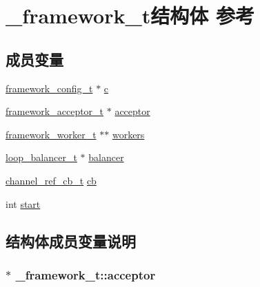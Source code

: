 \hypertarget{a00011}{}\section{\+\_\+framework\+\_\+t结构体 参考}
\label{a00011}
\subsection*{成员变量}
\begin{DoxyCompactItemize}
\item 
\hyperlink{a00047_a55b26efa9e6ee05514d087ba2593a54b_a55b26efa9e6ee05514d087ba2593a54b}{framework\+\_\+config\+\_\+t} $\ast$ \hyperlink{a00011_afe5323ec18afb54a631f5069fd2b904b_afe5323ec18afb54a631f5069fd2b904b}{c}
\item 
\hyperlink{a00047_ab0952db3c97c4760192720875e69d040_ab0952db3c97c4760192720875e69d040}{framework\+\_\+acceptor\+\_\+t} $\ast$ \hyperlink{a00011_a7167c11767ec44a7e5da53a805cfd439_a7167c11767ec44a7e5da53a805cfd439}{acceptor}
\item 
\hyperlink{a00047_aeb7a44e6b579659a8aae81f3ab819af3_aeb7a44e6b579659a8aae81f3ab819af3}{framework\+\_\+worker\+\_\+t} $\ast$$\ast$ \hyperlink{a00011_ae67335a4a11e73fa2c1bfdb0965c60c6_ae67335a4a11e73fa2c1bfdb0965c60c6}{workers}
\item 
\hyperlink{a00047_a649c7e850ab247b5f70ad27e335a129d_a649c7e850ab247b5f70ad27e335a129d}{loop\+\_\+balancer\+\_\+t} $\ast$ \hyperlink{a00011_a5ec36af472f9290ee5bdb4a7805b0ed3_a5ec36af472f9290ee5bdb4a7805b0ed3}{balancer}
\item 
\hyperlink{a00047_ae296ec4d1ce108960de8dcc423956a1d_ae296ec4d1ce108960de8dcc423956a1d}{channel\+\_\+ref\+\_\+cb\+\_\+t} \hyperlink{a00011_a60b32f8b2d610e5fc5fb816b4e0e7897_a60b32f8b2d610e5fc5fb816b4e0e7897}{cb}
\item 
int \hyperlink{a00011_a52822affef77067a5718084bd32253bd_a52822affef77067a5718084bd32253bd}{start}
\end{DoxyCompactItemize}


\subsection{结构体成员变量说明}
\hypertarget{a00011_a7167c11767ec44a7e5da53a805cfd439_a7167c11767ec44a7e5da53a805cfd439}{}
\subsubsection[{acceptor}]{$\ast$ \+\_\+framework\+\_\+t\+::acceptor}\label{a00011_a7167c11767ec44a7e5da53a805cfd439_a7167c11767ec44a7e5da53a805cfd439}
\hypertarget{a00011_a5ec36af472f9290ee5bdb4a7805b0ed3_a5ec36af472f9290ee5bdb4a7805b0ed3}{}
